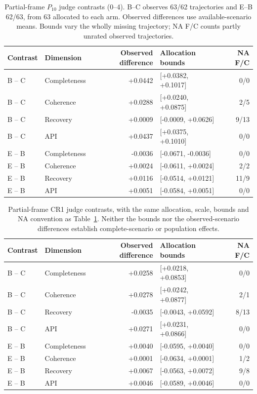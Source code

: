 \begin{table}[!htbp]
\centering\small
\caption{Partial-frame $P_{10}$ judge contrasts (0--4). B--C observes
63/62 trajectories and E--B 62/63, from 63 allocated to each arm.
Observed differences use available-scenario means. Bounds vary the wholly
missing trajectory; NA F/C counts partly unrated observed trajectories.}\label{tab:judgepartialp10}

\begin{tabular*}{\textwidth}{@{\extracolsep{\fill}}llrlr@{}}
\toprule
Contrast & Dimension & Observed difference & Allocation bounds & NA F/C \\
\midrule
B -- C & Completeness & +0.0442 & [+0.0382, +0.1017] & 0/0 \\
B -- C & Coherence & +0.0288 & [+0.0240, +0.0875] & 2/5 \\
B -- C & Recovery & +0.0009 & [-0.0009, +0.0626] & 9/13 \\
B -- C & API & +0.0437 & [+0.0375, +0.1010] & 0/0 \\
\midrule
E -- B & Completeness & -0.0036 & [-0.0671, -0.0036] & 0/0 \\
E -- B & Coherence & +0.0024 & [-0.0611, +0.0024] & 2/2 \\
E -- B & Recovery & +0.0116 & [-0.0514, +0.0121] & 11/9 \\
E -- B & API & +0.0051 & [-0.0584, +0.0051] & 0/0 \\
\bottomrule
\end{tabular*}
\end{table}

\begin{table}[!htbp]
\centering\small
\caption{Partial-frame CR1 judge contrasts, with the same allocation,
scale, bounds and NA convention as Table~\ref{tab:judgepartialp10}.
Neither the bounds nor the observed-scenario differences establish
complete-scenario or population effects.}\label{tab:judgepartialcr1}

\begin{tabular*}{\textwidth}{@{\extracolsep{\fill}}llrlr@{}}
\toprule
Contrast & Dimension & Observed difference & Allocation bounds & NA F/C \\
\midrule
B -- C & Completeness & +0.0258 & [+0.0218, +0.0853] & 0/0 \\
B -- C & Coherence & +0.0278 & [+0.0242, +0.0877] & 2/1 \\
B -- C & Recovery & -0.0035 & [-0.0043, +0.0592] & 8/13 \\
B -- C & API & +0.0271 & [+0.0231, +0.0866] & 0/0 \\
\midrule
E -- B & Completeness & +0.0040 & [-0.0595, +0.0040] & 0/0 \\
E -- B & Coherence & +0.0001 & [-0.0634, +0.0001] & 1/2 \\
E -- B & Recovery & +0.0067 & [-0.0563, +0.0072] & 9/8 \\
E -- B & API & +0.0046 & [-0.0589, +0.0046] & 0/0 \\
\bottomrule
\end{tabular*}
\end{table}

